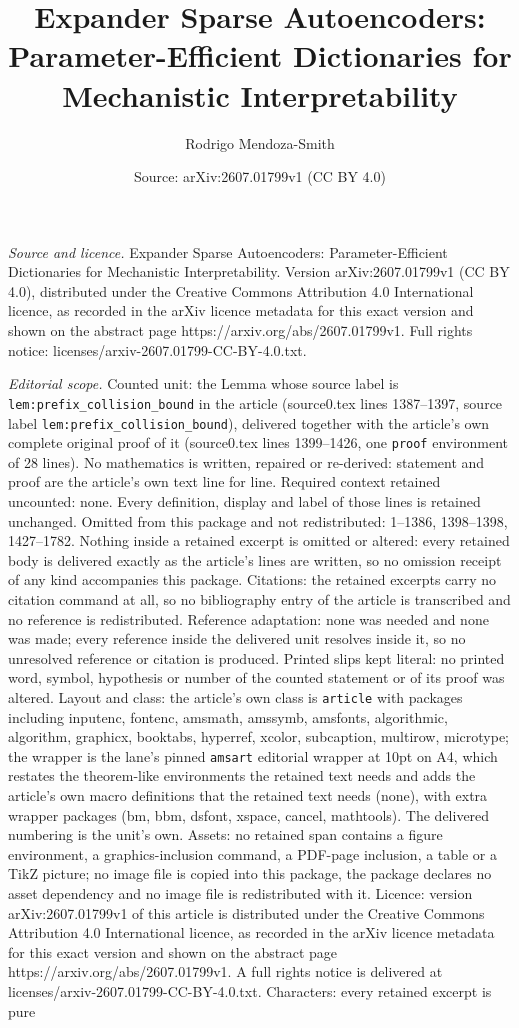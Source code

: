 \documentclass[10pt,a4paper]{amsart}
\title[Expander Sparse Autoencoders: Parameter-Efficient Dictionari]{Expander Sparse Autoencoders: Parameter-Efficient Dictionaries for Mechanistic Interpretability}
\author{Rodrigo Mendoza-Smith}
\date{Source: arXiv:2607.01799v1 (CC BY 4.0)}
\begin{document}
\maketitle

\noindent\emph{Source and licence.} Expander Sparse Autoencoders: Parameter-Efficient Dictionaries for Mechanistic Interpretability. Version arXiv:2607.01799v1 (CC BY 4.0), distributed under the Creative Commons Attribution 4.0 International licence, as recorded in the arXiv licence metadata for this exact version and shown on the abstract page https://arxiv.org/abs/2607.01799v1. Full rights notice: licenses/arxiv-2607.01799-CC-BY-4.0.txt.\par\smallskip

\noindent\textit{Editorial scope.} Counted unit: the Lemma whose source label is \texttt{lem:prefix\_collision\_bound} in the article (source0.tex lines 1387--1397, source label \texttt{lem:prefix\_collision\_bound}), delivered together with the article's own complete original proof of it (source0.tex lines 1399--1426, one \texttt{proof} environment of 28 lines). No mathematics is written, repaired or re-derived: statement and proof are the article's own text line for line. Required context retained uncounted: none. Every definition, display and label of those lines is retained unchanged. Omitted from this package and not redistributed: 1--1386, 1398--1398, 1427--1782. Nothing inside a retained excerpt is omitted or altered: every retained body is delivered exactly as the article's lines are written, so no omission receipt of any kind accompanies this package. Citations: the retained excerpts carry no citation command at all, so no bibliography entry of the article is transcribed and no reference is redistributed. Reference adaptation: none was needed and none was made; every reference inside the delivered unit resolves inside it, so no unresolved reference or citation is produced. Printed slips kept literal: no printed word, symbol, hypothesis or number of the counted statement or of its proof was altered. Layout and class: the article's own class is \texttt{article} with packages including inputenc, fontenc, amsmath, amssymb, amsfonts, algorithmic, algorithm, graphicx, booktabs, hyperref, xcolor, subcaption, multirow, microtype; the wrapper is the lane's pinned \texttt{amsart} editorial wrapper at 10pt on A4, which restates the theorem-like environments the retained text needs and adds the article's own macro definitions that the retained text needs (none), with extra wrapper packages (bm, bbm, dsfont, xspace, cancel, mathtools). The delivered numbering is the unit's own. Assets: no retained span contains a figure environment, a graphics-inclusion command, a PDF-page inclusion, a table or a TikZ picture; no image file is copied into this package, the package declares no asset dependency and no image file is redistributed with it. Licence: version arXiv:2607.01799v1 of this article is distributed under the Creative Commons Attribution 4.0 International licence, as recorded in the arXiv licence metadata for this exact version and shown on the abstract page https://arxiv.org/abs/2607.01799v1. A full rights notice is delivered at licenses/arxiv-2607.01799-CC-BY-4.0.txt. Characters: every retained excerpt is pure 
\end{document}
